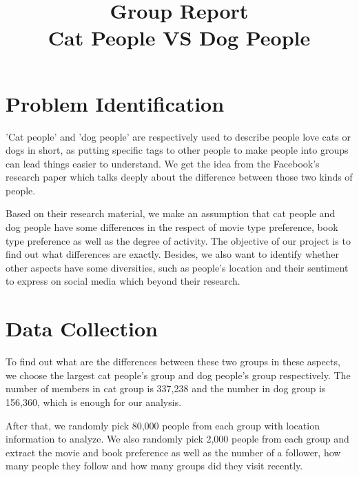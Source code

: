 \documentclass[12pt]{article}
\title{Group Report \\ Cat People VS Dog People}
\date{\vspace{-8ex}}
\begin{document}
\maketitle

\newpage

\begingroup
\singlespacing
\tableofcontents
\endgroup

\newpage

\section{Problem Identification}

'Cat people' and 'dog people' are respectively used to describe people love cats or dogs in short, as putting specific tags to other people to make people into groups can lead things easier to understand.
We get the idea from the Facebook's research paper\cite{lada} which talks deeply about the difference between those two kinds of people.

Based on their research material, we make an assumption that cat people and dog people have some differences in the respect of movie type preference, book type preference as well as the degree of activity. The objective of our project is to find out what differences are exactly. Besides, we also want to identify whether other aspects have some diversities, such as people's location and their sentiment to express on social media which beyond their research.

\section{Data Collection}

To find out what are the differences between these two groups in these aspects,
we choose the largest cat people's group and dog people's group respectively.
The number of members in cat group is 337,238 and the number in dog group is 156,360, which is enough for our analysis.

After that, we randomly pick 80,000 people from each group with location information to analyze. We also randomly pick 2,000 people from each group and extract the movie and book preference as well as the number of a follower, how many people they follow and how many groups did they visit recently.
\end{document}
